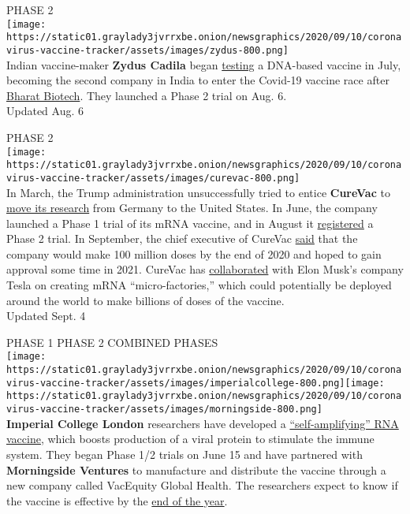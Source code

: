 PHASE 2\\
\texttt{[image: https://static01.graylady3jvrrxbe.onion/newsgraphics/2020/09/10/coronavirus-vaccine-tracker/assets/images/zydus-800.png]}\\
Indian vaccine-maker \textbf{\textbf{Zydus Cadila}} began
\href{https://twitter.com/ZydusUniverse/status/1278997989382483968}{testing}
a DNA-based vaccine in July, becoming the second company in India to
enter the Covid-19 vaccine race after \protect\hyperlink{bharat}{Bharat
Biotech}. They launched a Phase 2 trial on Aug. 6.\\
Updated Aug. 6

PHASE 2\\
\texttt{[image: https://static01.graylady3jvrrxbe.onion/newsgraphics/2020/09/10/coronavirus-vaccine-tracker/assets/images/curevac-800.png]}\\
In March, the Trump administration unsuccessfully tried to entice
\textbf{\textbf{CureVac}} to
\href{https://www.nytimes3xbfgragh.onion/2020/03/15/world/europe/cornonavirus-vaccine-us-germany.html}{move
its research} from Germany to the United States. In June, the company
launched a Phase 1 trial of its mRNA vaccine, and in August it
\href{https://clinicaltrials.gov/ct2/show/NCT04515147?term=vaccine\&recrs=abdf\&cond=COVID-19\&phase=0123\&sort=nwst\&draw=2\&rank=1}{registered}
a Phase 2 trial. In September, the chief executive of CureVac
\href{https://www.handelsblatt.com/unternehmen/management/der-risikoinvestor-dietmar-hopp-will-mit-curevac-rennen-um-besten-impfstoff-gewinnen/26154156.html}{said}
that the company would make 100 million doses by the end of 2020 and
hoped to gain approval some time in 2021. CureVac has
\href{https://observer.com/2020/09/tesla-elon-musk-germany-covid19-vaccine-collaboration-curevac/}{collaborated}
with Elon Musk's company Tesla on creating mRNA ``micro-factories,''
which could potentially be deployed around the world to make billions of
doses of the vaccine.\\
Updated Sept. 4

PHASE 1 PHASE 2 COMBINED PHASES\\
\texttt{[image: https://static01.graylady3jvrrxbe.onion/newsgraphics/2020/09/10/coronavirus-vaccine-tracker/assets/images/imperialcollege-800.png]}\texttt{[image: https://static01.graylady3jvrrxbe.onion/newsgraphics/2020/09/10/coronavirus-vaccine-tracker/assets/images/morningside-800.png]}\\
\textbf{\textbf{Imperial College London}} researchers have developed a
\href{https://www.nytimes3xbfgragh.onion/2020/06/07/world/europe/imperial-college-uk-vaccine-coronavirus.html}{``self-amplifying''
RNA vaccine}, which boosts production of a viral protein to stimulate
the immune system. They began Phase 1/2 trials on June 15 and have
partnered with \textbf{\textbf{Morningside Ventures}} to manufacture and
distribute the vaccine through a new company called VacEquity Global
Health. The researchers expect to know if the vaccine is effective by
the
\href{https://www.theguardian.com/society/2020/jul/03/im-cautiously-optimistic-imperials-robin-shattock-on-his-coronavirus-vaccine}{end
of the year}.

